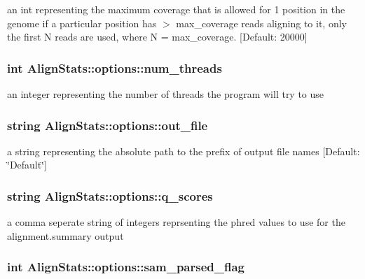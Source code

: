 \label{struct_align_stats_1_1options_af7fdf5340fa114c3296fd3f675b48b4f}
an int representing the maximum coverage that is allowed for 1 position in the genome if a particular position has $>$ max\_\-coverage reads aligning to it, only the first N reads are used, where N = max\_\-coverage. \mbox{[}Default: 20000\mbox{]} \hypertarget{struct_align_stats_1_1options_a5e25dc83b0fc3c8e955bf4267c6dc7d2}{
\subsubsection[{num\_\-threads}]{\setlength{\rightskip}{0pt plus 5cm}int {\bf AlignStats::options::num\_\-threads}}}
\label{struct_align_stats_1_1options_a5e25dc83b0fc3c8e955bf4267c6dc7d2}
an integer representing the number of threads the program will try to use \hypertarget{struct_align_stats_1_1options_aeccd6951719549cde348e6cd58e43283}{
\subsubsection[{out\_\-file}]{\setlength{\rightskip}{0pt plus 5cm}string {\bf AlignStats::options::out\_\-file}}}
\label{struct_align_stats_1_1options_aeccd6951719549cde348e6cd58e43283}
a string representing the absolute path to the prefix of output file names \mbox{[}Default: \char`\"{}Default\char`\"{}\mbox{]} \hypertarget{struct_align_stats_1_1options_af5705e123a1b8dc2fb5414415c6311bb}{
\subsubsection[{q\_\-scores}]{\setlength{\rightskip}{0pt plus 5cm}string {\bf AlignStats::options::q\_\-scores}}}
\label{struct_align_stats_1_1options_af5705e123a1b8dc2fb5414415c6311bb}
a comma seperate string of integers reprsenting the phred values to use for the alignment.summary output \hypertarget{struct_align_stats_1_1options_a37bd731bc14bf63365db2a82122b0609}{
\subsubsection[{sam\_\-parsed\_\-flag}]{\setlength{\rightskip}{0pt plus 5cm}int {\bf AlignStats::options::sam\_\-parsed\_\-flag}}}
